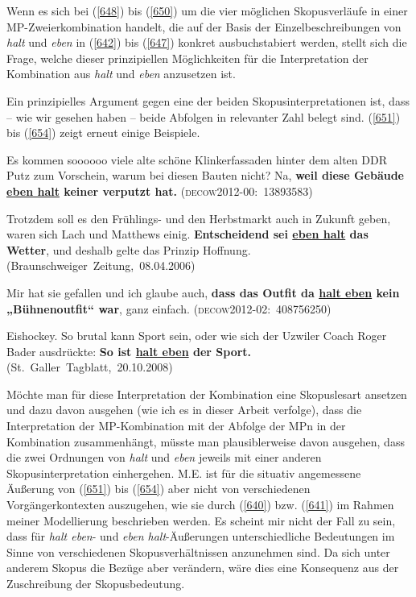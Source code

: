 Wenn es sich bei (\ref{648}) bis (\ref{650}) um die vier möglichen Skopusverläufe in einer MP-Zweierkombination handelt, die auf der Basis der Einzelbeschreibungen von \textit{halt} und \textit{eben} in (\ref{642}) bis (\ref{647}) konkret ausbuchstabiert werden, stellt sich die Frage, welche dieser prinzipiellen Möglichkeiten für die Interpretation der Kombination aus \textit{halt} und \textit{eben} anzusetzen ist.

Ein prinzipielles Argument gegen eine der beiden Skopusinterpretationen ist, dass – wie wir gesehen haben – beide Abfolgen in relevanter Zahl belegt sind. (\ref{651}) bis (\ref{654}) zeigt erneut einige Beispiele.

\begin{exe}
	\ex\label{651} 
	Es kommen soooooo viele alte schöne Klinkerfassaden hinter dem alten DDR Putz 
	zum Vorschein, warum bei diesen Bauten nicht? Na, \textbf{weil diese Gebäude \ul{eben halt} keiner verputzt hat.}	
	\hfill\hbox{\scshape(decow2012-00: 13893583)}
\end{exe}	          	                              

\begin{exe}
	\ex\label{652} 
	Trotzdem soll es den Frühlings- und den Herbstmarkt auch in Zukunft geben, waren sich Lach und Matthews einig. \textbf{Entscheidend sei \ul{eben halt} das Wetter}, und deshalb gelte das Prinzip Hoffnung.      
	\newline
	\hbox{}\hfill\hbox{(Braunschweiger Zeitung, 08.04.2006)}
\end{exe}			

\begin{exe}
	\ex\label{653} 
	Mir hat sie gefallen und ich glaube auch, \textbf{dass das Outfit da \ul{halt eben} kein „Bühnenoutfit“ war}, ganz einfach.  
	\hfill\hbox{\scshape(decow2012-02: 408756250)}
\end{exe}

\begin{exe}
	\ex\label{654} 
	Eishockey. So brutal kann Sport sein, oder wie sich der Uzwiler Coach Roger Bader ausdrückte:  \textbf{So ist \ul{halt eben} der Sport.}    
	\newline
	\hbox{}\hfill\hbox{(St. Galler Tagblatt, 20.10.2008)}
\end{exe}	                             
Möchte man für diese Interpretation der Kombination eine Skopuslesart ansetzen und dazu davon ausgehen (wie ich es in dieser Arbeit verfolge), dass die Interpretation der MP-Kombination mit der Abfolge der MPn in der Kombination zusammenhängt, müsste man plausiblerweise davon ausgehen, dass die zwei Ordnungen von \textit{halt} und \textit{eben} jeweils mit einer anderen Skopusinterpretation einhergehen. M.E. ist für die situativ angemessene Äußerung von (\ref{651}) bis (\ref{654}) aber nicht von verschiedenen Vorgängerkontexten auszugehen, wie sie durch (\ref{640}) bzw. (\ref{641}) im Rahmen meiner Modellierung beschrieben werden. Es scheint mir nicht der Fall zu sein, dass für \textit{halt eben}- und \textit{eben halt}-Äußerungen unterschiedliche Bedeutungen im Sinne von verschiedenen Skopusverhältnissen anzunehmen sind. Da sich unter anderem Skopus die Bezüge aber verändern, wäre dies eine Konsequenz aus der Zuschreibung der Skopusbedeutung. 

